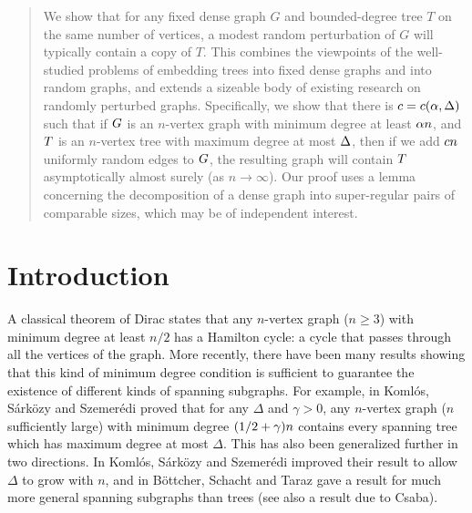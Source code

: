 \documentclass[11pt,english]{article}
\theoremstyle{plain}
\newtheorem{thm}{\protect\theoremname}
\theoremstyle{plain}
\newtheorem{cor}[thm]{\protect\corollaryname}
\theoremstyle{plain}
\newtheorem{lem}[thm]{\protect\lemmaname}
\theoremstyle{plain}
\newtheorem{prop}[thm]{\protect\propositionname}
\theoremstyle{plain}
\newtheorem{conjecture}[thm]{\protect\conjecturename}
\theoremstyle{definition}
\newtheorem{defn}[thm]{\protect\definitionname}
\theoremstyle{definition}
\newtheorem{example}[thm]{\protect\examplename}
\theoremstyle{remark}
\newtheorem{rem}[thm]{\protect\remarkname}
\theoremstyle{remark}
\newtheorem{claim}[thm]{\protect\claimname}
\theoremstyle{plain}
\newtheorem{mythm}{\protect\theoremname}
\renewenvironment{thm}{\begin{mythm}}{\end{mythm}}
\theoremstyle{definition}
\newtheorem{mydefn}[mythm]{\protect\definitionname}
\renewenvironment{defn}{\begin{mydefn}}{\end{mydefn}}
\theoremstyle{definition}
\newtheorem{myexample}[mythm]{\protect\examplename}
\renewenvironment{example}{\begin{myexample}}{\end{myexample}}
\theoremstyle{plain}
\newtheorem{myprop}[mythm]{\protect\propositionname}
\renewenvironment{prop}{\begin{myprop}}{\end{myprop}}
\theoremstyle{plain}
\newtheorem{mycor}[mythm]{\protect\corollaryname}
\renewenvironment{cor}{\begin{mycor}}{\end{mycor}}
\theoremstyle{plain}
\newtheorem{mylem}[mythm]{\protect\lemmaname}
\renewenvironment{lem}{\begin{mylem}}{\end{mylem}}
\theoremstyle{plain}
\newtheorem{myconjecture}[mythm]{\protect\conjecturename}
\renewenvironment{conjecture}{\begin{myconjecture}}{\end{myconjecture}}
\theoremstyle{remark}
\newtheorem{myrem}[mythm]{\protect\remarkname}
\renewenvironment{rem}{\begin{myrem}}{\end{myrem}}
\theoremstyle{plain}
\newtheorem{myclaim}[mythm]{\protect\claimname}
\renewenvironment{claim}{\begin{myclaim}}{\end{myclaim}}
\theoremstyle{definition}
\let\originalleft\left
\let\originalright\right
\renewcommand{\left}{\mathopen{}\mathclose\bgroup\originalleft}
\renewcommand{\right}{\aftergroup\egroup\originalright}
\providecommand{\claimname}{Claim}
\providecommand{\conjecturename}{Conjecture}
\providecommand{\corollaryname}{Corollary}
\providecommand{\definitionname}{Definition}
\providecommand{\examplename}{Example}
\providecommand{\lemmaname}{Lemma}
\providecommand{\propositionname}{Proposition}
\providecommand{\remarkname}{Remark}
\providecommand{\theoremname}{Theorem}
\begin{document}
\begin{abstract}
We show that for any fixed dense graph $G$ and bounded-degree tree
$T$ on the same number of vertices, a modest random perturbation
of $G$ will typically contain a copy of $T$. This combines the viewpoints
of the well-studied problems of embedding trees into fixed dense graphs
and into random graphs, and extends a sizeable body of existing research
on randomly perturbed graphs. Specifically, we show that there is
$\c=\c\left(\a,\D\right)$ such that if $G$ is an $n$-vertex graph
with minimum degree at least $\alpha n$, and $T$ is an $n$-vertex
tree with maximum degree at most $\Delta$, then if we add $c n$ uniformly
random edges to $G$, the resulting graph will contain $T$ asymptotically
almost surely (as $n\to\infty$). Our proof uses a lemma concerning
the decomposition of a dense graph into super-regular pairs of comparable
sizes, which may be of independent interest.
\end{abstract}
\begin{comment}
\begin{thm}
t\end{thm}
\begin{cor}
c\end{cor}
\begin{lem}
l\end{lem}
\begin{prop}
p\end{prop}
\begin{conjecture}
c\end{conjecture}
\begin{defn}
d\end{defn}
\begin{example}
e\end{example}
\begin{rem}
r\end{rem}
\begin{claim}
c
\end{claim}
\end{comment}


\section{Introduction}

A classical theorem of Dirac \cite{Dir52} states that any $n$-vertex
graph ($n\ge3$) with minimum degree at least $n/2$ has a Hamilton
cycle: a cycle that passes through all the vertices of the graph.
More recently, there have been many results showing that this kind
of minimum degree condition is sufficient to guarantee the existence
of different kinds of spanning subgraphs. For example, in \cite[Theorem~1$'$]{KSS95}
Koml\'os, S\'ark\"ozy and Szemer\'edi proved that for any $\Delta$
and $\gamma>0$, any $n$-vertex graph ($n$ sufficiently large) with
minimum degree $\left(1/2+\gamma\right)n$ contains every spanning
tree which has maximum degree at most $\Delta$. This has also been
generalized further in two directions. In \cite{KSS01} Koml\'os,
S\'ark\"ozy and Szemer\'edi improved their result to allow $\Delta$
to grow with $n$, and in \cite{BST09} B\"ottcher, Schacht and Taraz
gave a result for much more general spanning subgraphs than trees
(see also a result \cite{Csa08} due to Csaba).
\end{document}
